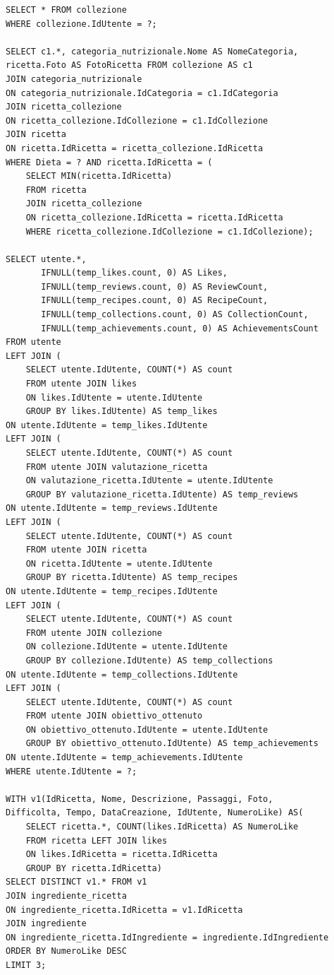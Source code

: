 ﻿\documentclass[a4paper,12pt]{report}
\begin{document}
\begin{verbatim}
SELECT * FROM collezione
WHERE collezione.IdUtente = ?;

SELECT c1.*, categoria_nutrizionale.Nome AS NomeCategoria,
ricetta.Foto AS FotoRicetta FROM collezione AS c1
JOIN categoria_nutrizionale 
ON categoria_nutrizionale.IdCategoria = c1.IdCategoria
JOIN ricetta_collezione 
ON ricetta_collezione.IdCollezione = c1.IdCollezione
JOIN ricetta 
ON ricetta.IdRicetta = ricetta_collezione.IdRicetta
WHERE Dieta = ? AND ricetta.IdRicetta = (
    SELECT MIN(ricetta.IdRicetta)
    FROM ricetta
    JOIN ricetta_collezione
    ON ricetta_collezione.IdRicetta = ricetta.IdRicetta
    WHERE ricetta_collezione.IdCollezione = c1.IdCollezione);

SELECT utente.*,
       IFNULL(temp_likes.count, 0) AS Likes,
       IFNULL(temp_reviews.count, 0) AS ReviewCount,
       IFNULL(temp_recipes.count, 0) AS RecipeCount,
       IFNULL(temp_collections.count, 0) AS CollectionCount,
       IFNULL(temp_achievements.count, 0) AS AchievementsCount
FROM utente
LEFT JOIN (
    SELECT utente.IdUtente, COUNT(*) AS count
    FROM utente JOIN likes
    ON likes.IdUtente = utente.IdUtente
    GROUP BY likes.IdUtente) AS temp_likes
ON utente.IdUtente = temp_likes.IdUtente
LEFT JOIN (
    SELECT utente.IdUtente, COUNT(*) AS count
    FROM utente JOIN valutazione_ricetta
    ON valutazione_ricetta.IdUtente = utente.IdUtente
    GROUP BY valutazione_ricetta.IdUtente) AS temp_reviews
ON utente.IdUtente = temp_reviews.IdUtente
LEFT JOIN (
    SELECT utente.IdUtente, COUNT(*) AS count
    FROM utente JOIN ricetta
    ON ricetta.IdUtente = utente.IdUtente
    GROUP BY ricetta.IdUtente) AS temp_recipes
ON utente.IdUtente = temp_recipes.IdUtente
LEFT JOIN (
    SELECT utente.IdUtente, COUNT(*) AS count
    FROM utente JOIN collezione
    ON collezione.IdUtente = utente.IdUtente
    GROUP BY collezione.IdUtente) AS temp_collections
ON utente.IdUtente = temp_collections.IdUtente
LEFT JOIN (
    SELECT utente.IdUtente, COUNT(*) AS count
    FROM utente JOIN obiettivo_ottenuto
    ON obiettivo_ottenuto.IdUtente = utente.IdUtente
    GROUP BY obiettivo_ottenuto.IdUtente) AS temp_achievements
ON utente.IdUtente = temp_achievements.IdUtente
WHERE utente.IdUtente = ?;

WITH v1(IdRicetta, Nome, Descrizione, Passaggi, Foto,
Difficolta, Tempo, DataCreazione, IdUtente, NumeroLike) AS(
    SELECT ricetta.*, COUNT(likes.IdRicetta) AS NumeroLike
    FROM ricetta LEFT JOIN likes
    ON likes.IdRicetta = ricetta.IdRicetta
    GROUP BY ricetta.IdRicetta)
SELECT DISTINCT v1.* FROM v1
JOIN ingrediente_ricetta
ON ingrediente_ricetta.IdRicetta = v1.IdRicetta
JOIN ingrediente
ON ingrediente_ricetta.IdIngrediente = ingrediente.IdIngrediente
ORDER BY NumeroLike DESC
LIMIT 3;


\end{verbatim}
\end{document}
